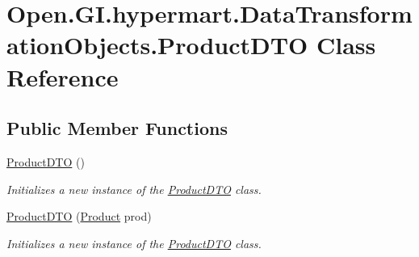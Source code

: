 \hypertarget{class_open_1_1_g_i_1_1hypermart_1_1_data_transformation_objects_1_1_product_d_t_o}{}\section{Open.\+G\+I.\+hypermart.\+Data\+Transformation\+Objects.\+Product\+D\+TO Class Reference}
\label{class_open_1_1_g_i_1_1hypermart_1_1_data_transformation_objects_1_1_product_d_t_o}


 


\subsection*{Public Member Functions}
\begin{DoxyCompactItemize}
\item 
\hyperlink{class_open_1_1_g_i_1_1hypermart_1_1_data_transformation_objects_1_1_product_d_t_o_a99130c4316beb76caa542b78f0de4e38}{Product\+D\+TO} ()
\begin{DoxyCompactList}\small\item\em Initializes a new instance of the \hyperlink{class_open_1_1_g_i_1_1hypermart_1_1_data_transformation_objects_1_1_product_d_t_o}{Product\+D\+TO} class. \end{DoxyCompactList}\item 
\hyperlink{class_open_1_1_g_i_1_1hypermart_1_1_data_transformation_objects_1_1_product_d_t_o_a4deb78b33f6f3fc07ec2d4f49ada1f93}{Product\+D\+TO} (\hyperlink{class_open_1_1_g_i_1_1hypermart_1_1_models_1_1_product}{Product} prod)
\begin{DoxyCompactList}\small\item\em Initializes a new instance of the \hyperlink{class_open_1_1_g_i_1_1hypermart_1_1_data_transformation_objects_1_1_product_d_t_o}{Product\+D\+TO} class. \end{DoxyCompactList}\end{DoxyCompactItemize}
